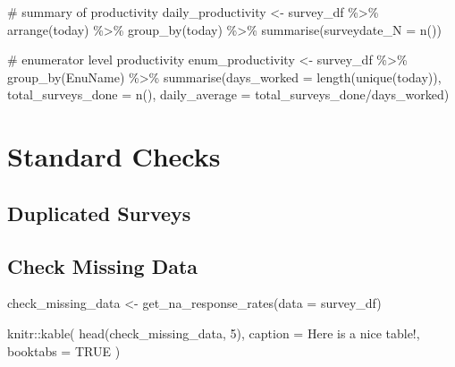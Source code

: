 \documentclass[
  letterpaper,
  DIV=11,
  numbers=noendperiod]{scrreprt}
\newenvironment{Shaded}{\begin{snugshade}}{\end{snugshade}}
\newcommand{\AttributeTok}[1]{\textcolor[rgb]{0.40,0.45,0.13}{#1}}
\newcommand{\CommentTok}[1]{\textcolor[rgb]{0.37,0.37,0.37}{#1}}
\newcommand{\ConstantTok}[1]{\textcolor[rgb]{0.56,0.35,0.01}{#1}}
\newcommand{\DecValTok}[1]{\textcolor[rgb]{0.68,0.00,0.00}{#1}}
\newcommand{\FunctionTok}[1]{\textcolor[rgb]{0.28,0.35,0.67}{#1}}
\newcommand{\NormalTok}[1]{\textcolor[rgb]{0.00,0.23,0.31}{#1}}
\newcommand{\OtherTok}[1]{\textcolor[rgb]{0.00,0.23,0.31}{#1}}
\newcommand{\SpecialCharTok}[1]{\textcolor[rgb]{0.37,0.37,0.37}{#1}}
\newcommand{\StringTok}[1]{\textcolor[rgb]{0.13,0.47,0.30}{#1}}
\begin{document}
\begin{Shaded}
\begin{Highlighting}[]
\CommentTok{\# summary of productivity}
\NormalTok{daily\_productivity }\OtherTok{\textless{}{-}}\NormalTok{ survey\_df }\SpecialCharTok{\%\textgreater{}\%} 
  \FunctionTok{arrange}\NormalTok{(today) }\SpecialCharTok{\%\textgreater{}\%} 
  \FunctionTok{group\_by}\NormalTok{(today) }\SpecialCharTok{\%\textgreater{}\%} 
  \FunctionTok{summarise}\NormalTok{(}\AttributeTok{surveydate\_N =} \FunctionTok{n}\NormalTok{())}

\CommentTok{\# enumerator level productivity}
\NormalTok{enum\_productivity }\OtherTok{\textless{}{-}}\NormalTok{ survey\_df }\SpecialCharTok{\%\textgreater{}\%} 
  \FunctionTok{group\_by}\NormalTok{(EnuName) }\SpecialCharTok{\%\textgreater{}\%} 
  \FunctionTok{summarise}\NormalTok{(}\AttributeTok{days\_worked =} \FunctionTok{length}\NormalTok{(}\FunctionTok{unique}\NormalTok{(today)), }\AttributeTok{total\_surveys\_done =} \FunctionTok{n}\NormalTok{(), }\AttributeTok{daily\_average =}\NormalTok{ total\_surveys\_done}\SpecialCharTok{/}\NormalTok{days\_worked)}
\end{Highlighting}
\end{Shaded}

\hypertarget{standard-checks}{%
\section{Standard Checks}\label{standard-checks}}

\hypertarget{duplicated-surveys}{%
\subsection{Duplicated Surveys}\label{duplicated-surveys}}

\hypertarget{check-missing-data}{%
\subsection{Check Missing Data}\label{check-missing-data}}

\begin{Shaded}
\begin{Highlighting}[]
\NormalTok{check\_missing\_data }\OtherTok{\textless{}{-}} \FunctionTok{get\_na\_response\_rates}\NormalTok{(}\AttributeTok{data =}\NormalTok{ survey\_df)}
\end{Highlighting}
\end{Shaded}

\begin{Shaded}
\begin{Highlighting}[]
\NormalTok{knitr}\SpecialCharTok{::}\FunctionTok{kable}\NormalTok{(}
  \FunctionTok{head}\NormalTok{(check\_missing\_data, }\DecValTok{5}\NormalTok{), }\AttributeTok{caption =} \StringTok{\textquotesingle{}Here is a nice table!\textquotesingle{}}\NormalTok{,}
  \AttributeTok{booktabs =} \ConstantTok{TRUE}
\NormalTok{)}
\end{Highlighting}
\end{Shaded}
\end{document}
